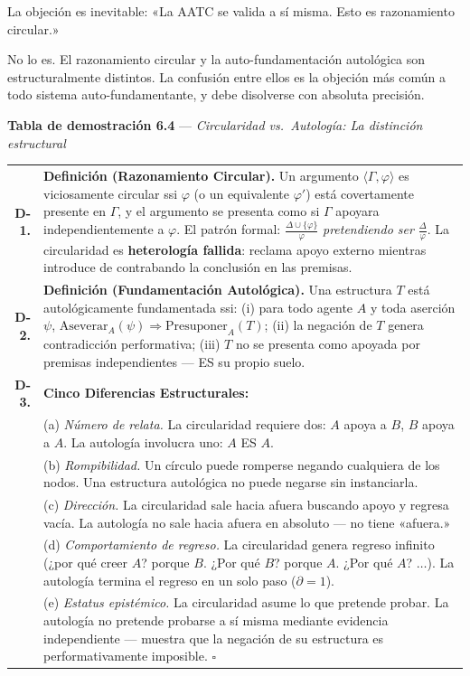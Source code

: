 \documentclass[10pt, openany, oneside]{book}
\renewcommand{\footnotesize}{\fontsize{8.5}{11}\selectfont}
\begin{document}
\noindent La objeción es inevitable: «La AATC se valida a sí misma. Esto es razonamiento circular.»

No lo es. El razonamiento circular y la auto-fundamentación autológica son estructuralmente distintos. La confusión entre ellos es la objeción más común a todo sistema auto-fundamentante, y debe disolverse con absoluta precisión.

\textbf{Tabla de demostración 6.4} --- \textit{Circularidad vs.\ Autología: La distinción estructural}

\vspace{0.5em}

{\footnotesize
\noindent\begin{tabular}{r p{}}
\textbf{D-1.} & \textbf{Definición (Razonamiento Circular).} Un argumento $\langle \Gamma, \varphi \rangle$ es viciosamente circular ssi $\varphi$ (o un equivalente $\varphi'$) está covertamente presente en $\Gamma$, y el argumento se presenta como si $\Gamma$ apoyara independientemente a $\varphi$. El patrón formal: $\frac{\Delta \cup \{\varphi\}}{\varphi}$ \textit{pretendiendo ser} $\frac{\Delta}{\varphi}$. La circularidad es \textbf{heterología fallida}: reclama apoyo externo mientras introduce de contrabando la conclusión en las premisas. \\[0.5em]
\textbf{D-2.} & \textbf{Definición (Fundamentación Autológica).} Una estructura $T$ está autológicamente fundamentada ssi: (i) para todo agente $A$ y toda aserción $\psi$, $\text{Aseverar}_A(\psi) \Rightarrow \text{Presuponer}_A(T)$; (ii) la negación de $T$ genera contradicción performativa; (iii) $T$ no se presenta como apoyada por premisas independientes --- ES su propio suelo. \\[0.5em]
\textbf{D-3.} & \textbf{Cinco Diferencias Estructurales:} \\[0.3em]
& (a) \textit{Número de relata.} La circularidad requiere dos: $A$ apoya a $B$, $B$ apoya a $A$. La autología involucra uno: $A$ ES $A$. \\[0.2em]
& (b) \textit{Rompibilidad.} Un círculo puede romperse negando cualquiera de los nodos. Una estructura autológica no puede negarse sin instanciarla. \\[0.2em]
& (c) \textit{Dirección.} La circularidad sale hacia afuera buscando apoyo y regresa vacía. La autología no sale hacia afuera en absoluto --- no tiene «afuera.» \\[0.2em]
& (d) \textit{Comportamiento de regreso.} La circularidad genera regreso infinito (¿por qué creer $A$? porque $B$. ¿Por qué $B$? porque $A$. ¿Por qué $A$? $\ldots$). La autología termina el regreso en un solo paso ($\partial = 1$). \\[0.2em]
& (e) \textit{Estatus epistémico.} La circularidad asume lo que pretende probar. La autología no pretende probarse a sí misma mediante evidencia independiente --- muestra que la negación de su estructura es performativamente imposible. $\square$ \\[0.3em]
\end{tabular}
}
\end{document}
